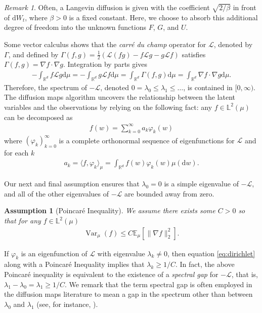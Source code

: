 \documentclass[11pt]{article}
\theoremstyle{plain}
\newtheorem{assumption}{Assumption}
\theoremstyle{definition}
\theoremstyle{remark}
\newtheorem{remark}[theorem]{Remark}
\numberwithin{equation}{section}
\newcommand{\R}{\mathbb{R}}
\renewcommand{\L}{\mathscr{L}}
\renewcommand{\d}{\mathrm{d}}
\newcommand{\lb}{\left}
\newcommand{\rb}{\right}
\newcommand{\bL}{\mathbb{L}}
\newcommand{\E}{\mathbb{E}}
\newcommand{\Var}{\operatorname{Var}}
\begin{document}
\begin{remark}
Often, a Langevin diffusion is given with the coefficient $\sqrt{2/\beta}$ in front of $\d W_t$, where $\beta>0$ is a fixed constant. Here, we choose to absorb this additional degree of freedom into the unknown functions $F$, $G$, and $U$. 
\end{remark}

Some vector calculus shows that the \emph{carr\'{e} du champ} operator for $\L$, denoted by $\Gamma$, and defined by $\Gamma(f,g)=\frac{1}{2}\lb(\L (fg)-f\L g-g\L f\rb)$ satisfies $\Gamma(f,g)=\nabla f\cdot \nabla g$.
Integration by parts gives
\begin{align}\label{eq:dirichlet}
-\int_{\R^d} f \L g \d\mu = -\int_{\R^d} g \L f \d\mu=\int_{\R^d} \Gamma(f,g) \d\mu=\int_{\R^d} \nabla f\cdot \nabla g \d\mu.
\end{align}
Therefore, the spectrum of $-\L$, denoted $0=\lambda_0\le \lambda_1\le\dots$,  is contained in $[0,\infty)$.
The diffusion maps algorithm uncovers the relationship between the latent variables and the observations by relying on the following fact: any ${f\in \bL^2(\mu)}$ can be decomposed as
\begin{align}\label{eq:fexpansion}
f(w)=\sum_{k=0}^\infty a_k \varphi_k(w)
\end{align}
where $(\varphi_k)_{k=0}^\infty$ is a complete orthonormal sequence of eigenfunctions for $\L$ and for each $k$
\begin{align}\label{eq:muprojection}
a_k=\langle f,\varphi_k\rangle_{\mu}=\int_{\R^d}f(w)\varphi_k(w)\mu(\d w).
\end{align}

Our next and final assumption ensures that $\lambda_0=0$ is a simple eigenvalue of $-\L$, and all of the other eigenvalues of $-\L$ are bounded away from zero.

\begin{assumption}[Poincar\'{e} Inequality]\label{ass3}
We assume there exists some $C>0$ so that for any ${f\in \bL^2(\mu)}$
\begin{align*}
\Var_{\mu}(f)\le C \E_{\mu}[\|\nabla f\|_2^2].
\end{align*}
\end{assumption}
If $\varphi_k$ is an eigenfunction of $\L$ with eigenvalue $\lambda_k\neq 0$, then equation \eqref{eq:dirichlet} along with a Poincar\'{e} Inequality implies that $\lambda_k\ge 1/C$. In fact, the above Poincar\'{e} inequality is equivalent to the existence of a \emph{spectral gap} for $-\L$, that is, $\lambda_1-\lambda_0=\lambda_1\ge 1/C$. We remark that the term spectral gap is often employed in the diffusion maps literature to mean a gap in the spectrum other than between $\lambda_0$ and $\lambda_1$ (see, for instance, \citet[Section 3.2]{coifman2008diffusion}).
\end{document}

